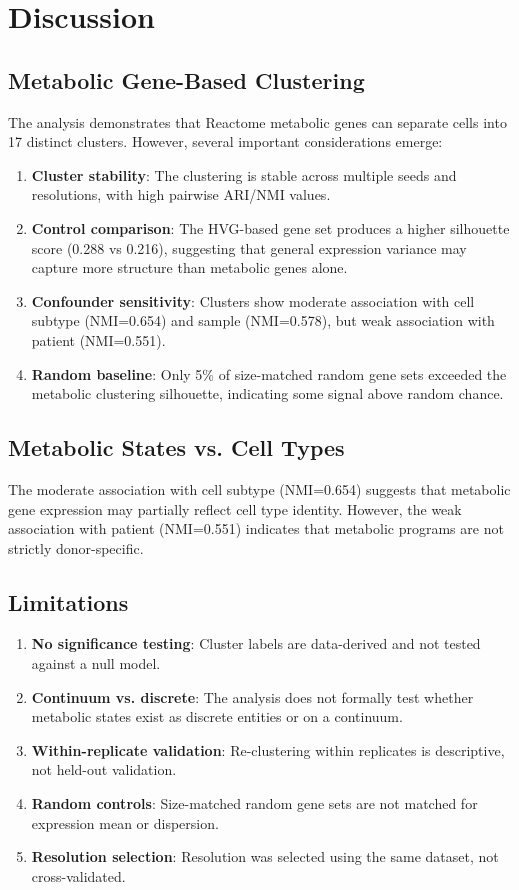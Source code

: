 \documentclass[12pt, a4paper]{article}
\begin{document}
\section{Discussion}

\subsection{Metabolic Gene-Based Clustering}
The analysis demonstrates that Reactome metabolic genes can separate cells into 17 distinct clusters. However, several important considerations emerge:

\begin{enumerate}
    \item \textbf{Cluster stability}: The clustering is stable across multiple seeds and resolutions, with high pairwise ARI/NMI values.
    \item \textbf{Control comparison}: The HVG-based gene set produces a higher silhouette score (0.288 vs 0.216), suggesting that general expression variance may capture more structure than metabolic genes alone.
    \item \textbf{Confounder sensitivity}: Clusters show moderate association with cell subtype (NMI=0.654) and sample (NMI=0.578), but weak association with patient (NMI=0.551).
    \item \textbf{Random baseline}: Only 5\% of size-matched random gene sets exceeded the metabolic clustering silhouette, indicating some signal above random chance.
\end{enumerate}

\subsection{Metabolic States vs. Cell Types}
The moderate association with cell subtype (NMI=0.654) suggests that metabolic gene expression may partially reflect cell type identity. However, the weak association with patient (NMI=0.551) indicates that metabolic programs are not strictly donor-specific.

\subsection{Limitations}
\begin{enumerate}
    \item \textbf{No significance testing}: Cluster labels are data-derived and not tested against a null model.
    \item \textbf{Continuum vs. discrete}: The analysis does not formally test whether metabolic states exist as discrete entities or on a continuum.
    \item \textbf{Within-replicate validation}: Re-clustering within replicates is descriptive, not held-out validation.
    \item \textbf{Random controls}: Size-matched random gene sets are not matched for expression mean or dispersion.
    \item \textbf{Resolution selection}: Resolution was selected using the same dataset, not cross-validated.
\end{enumerate}
\end{document}
